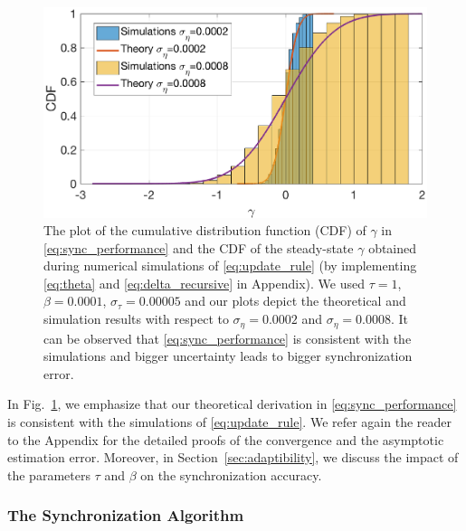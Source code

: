 \documentclass[journal,draftcls,onecolumn,12pt,twoside]{IEEEtranTCOM}
\begin{document}
\begin{figure}
	\centering
	\includegraphics[scale=0.35]{figures/sim-theory.eps}
	\caption{\label{fig:theory-vs-simulations} The plot of the cumulative distribution function (CDF) of $\gamma$ in \eqref{eq:sync_performance} and the CDF of the steady-state $\gamma$ obtained during numerical simulations of \eqref{eq:update_rule} (by implementing \eqref{eq:theta} and \eqref{eq:delta_recursive} in Appendix). We used $\tau=1$, $\beta= 0.0001$, $\sigma_{\tau}=0.00005$ and our plots depict the theoretical and simulation results with respect to $\sigma_\eta = 0.0002$ and $\sigma_\eta = 0.0008.$ It can be observed that \eqref{eq:sync_performance} is consistent with the simulations and bigger uncertainty leads to bigger synchronization error.}
\end{figure}
In Fig.~\ref{fig:theory-vs-simulations}, we emphasize that our theoretical derivation in \eqref{eq:sync_performance} is consistent with the simulations of \eqref{eq:update_rule}. We refer again the reader to the Appendix for the detailed proofs of the convergence and the asymptotic estimation error. Moreover, in Section~\ref{sec:adaptibility}, we discuss the impact of the parameters $\tau$ and $\beta$ on the synchronization accuracy.

\subsubsection{The Synchronization Algorithm}
\end{document}
